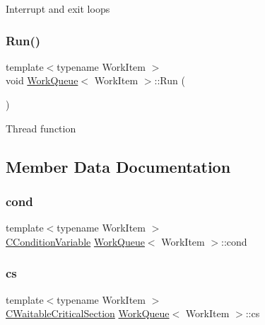 Interrupt and exit loops \mbox{\label{class_work_queue_a762b775b6ec11e2f8351ad79fd6782ba}} 
\subsubsection{\texorpdfstring{Run()}{Run()}}
{\footnotesize\ttfamily template$<$typename Work\+Item $>$ \\
void \mbox{\hyperlink{class_work_queue}{Work\+Queue}}$<$ Work\+Item $>$\+::Run (\begin{DoxyParamCaption}{ }\end{DoxyParamCaption})\hspace{0.3cm}{\ttfamily [inline]}}

Thread function 

\subsection{Member Data Documentation}
\mbox{\label{class_work_queue_aa95952abd888d36878b352dbce9e26c6}} 
\subsubsection{\texorpdfstring{cond}{cond}}
{\footnotesize\ttfamily template$<$typename Work\+Item $>$ \\
\mbox{\hyperlink{sync_8h_acdd2020d08e99abd9504ea67d0190520}{C\+Condition\+Variable}} \mbox{\hyperlink{class_work_queue}{Work\+Queue}}$<$ Work\+Item $>$\+::cond\hspace{0.3cm}{\ttfamily [private]}}

\mbox{\label{class_work_queue_a57782013276daff0989bca48ebb454db}} 
\subsubsection{\texorpdfstring{cs}{cs}}
{\footnotesize\ttfamily template$<$typename Work\+Item $>$ \\
\mbox{\hyperlink{sync_8h_a341e0aa38106c4dbcedbba878dceb1a5}{C\+Waitable\+Critical\+Section}} \mbox{\hyperlink{class_work_queue}{Work\+Queue}}$<$ Work\+Item $>$\+::cs\hspace{0.3cm}{\ttfamily [private]}}

